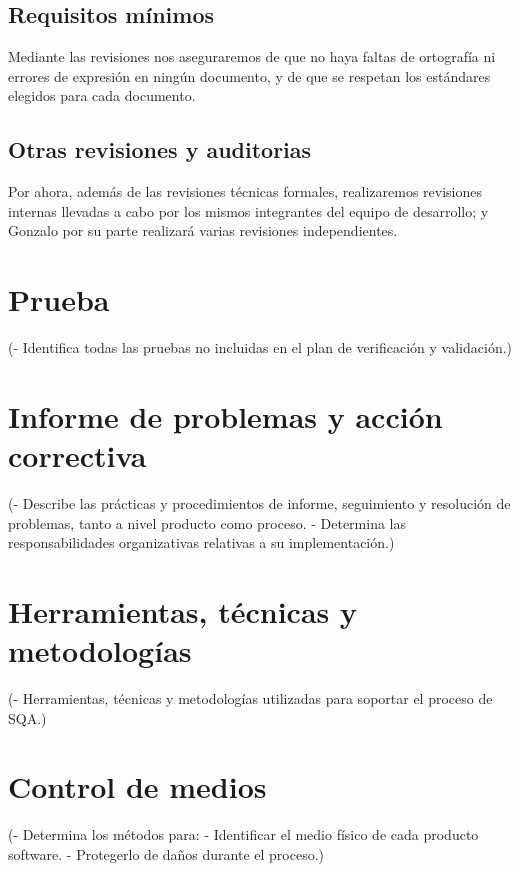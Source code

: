 \documentclass[spanish,a4paper,11pt, twoside]{report}	%
\begin{document}
	\section{Requisitos mínimos}
	Mediante las revisiones nos aseguraremos de que no haya faltas de ortografía ni errores de expresión en ningún documento, y de que se respetan los estándares elegidos para cada documento.
	\section{Otras revisiones y auditorias}
	Por ahora, además de las revisiones técnicas formales, realizaremos revisiones internas llevadas a cabo por los mismos integrantes del  equipo de desarrollo;  y Gonzalo por su parte realizará varias revisiones independientes.

\newpage
\mbox{}
\thispagestyle{empty}						%
\newpage

\chapter{ Prueba}%
	(- Identifica todas las pruebas no incluidas en el plan
	de verificación y validación.)

\newpage
\mbox{}
\thispagestyle{empty}						%
\newpage

\chapter{ \hspace{0.25cm}Informe de problemas y acción correctiva}
	(- Describe las prácticas y procedimientos de informe,
	seguimiento y resolución de problemas, tanto a nivel	
	producto como proceso.
	- Determina las responsabilidades organizativas
	relativas a su implementación.)

\newpage
\mbox{}
\thispagestyle{empty}						%
\newpage

\chapter{ Herramientas, técnicas y metodologías}
	(- Herramientas, técnicas y metodologías utilizadas
	para soportar el proceso de SQA.)

\newpage
\mbox{}
\thispagestyle{empty}						%
\newpage

\chapter{ Control de medios}
	(- Determina los métodos para:
	- Identificar el medio físico de cada producto software.
	- Protegerlo de daños durante el proceso.)
\end{document}
